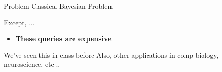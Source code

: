
\begin{frame}{Problem}
  Classical Bayesian Problem

  Except, ...
  \begin{itemize}
    \item \textbf{These queries are expensive}.
  \end{itemize}
\end{frame}

\begin{frame}{We've seen this in class before}
  Also, other applications in comp-biology, neuroscience, etc ..
\end{frame}

